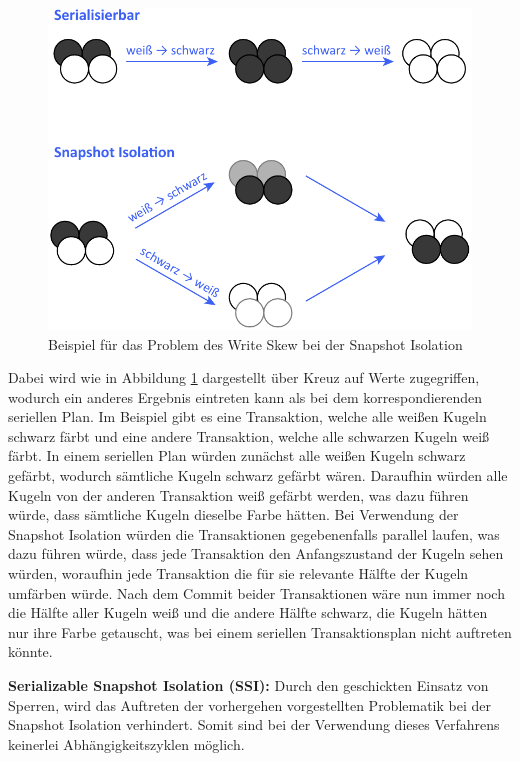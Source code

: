 \begin{figure}
	\includegraphics[width=0.8\columnwidth]{img/write_skew.pdf}
	\caption{Beispiel für das Problem des Write Skew bei der Snapshot Isolation \cite{write_skew}}
	\label{fig:write_skew}
\end{figure}

Dabei wird wie in Abbildung \ref{fig:write_skew} dargestellt über Kreuz auf Werte zugegriffen, wodurch ein anderes Ergebnis eintreten kann als bei dem korrespondierenden seriellen Plan.
Im Beispiel gibt es eine Transaktion, welche alle weißen Kugeln schwarz färbt und eine andere Transaktion, welche alle schwarzen Kugeln weiß färbt.
In einem seriellen Plan würden zunächst alle weißen Kugeln schwarz gefärbt, wodurch sämtliche Kugeln schwarz gefärbt wären.
Daraufhin würden alle Kugeln von der anderen Transaktion weiß gefärbt werden, was dazu führen würde, dass sämtliche Kugeln dieselbe Farbe hätten.
Bei Verwendung der Snapshot Isolation würden die Transaktionen gegebenenfalls parallel laufen, was dazu führen würde, dass jede Transaktion den Anfangszustand der Kugeln sehen würden, woraufhin jede Transaktion die für sie relevante Hälfte der Kugeln umfärben würde.
Nach dem Commit beider Transaktionen wäre nun immer noch die Hälfte aller Kugeln weiß und die andere Hälfte schwarz, die Kugeln hätten nur ihre Farbe getauscht, was bei einem seriellen Transaktionsplan nicht auftreten könnte.

\textbf{Serializable Snapshot Isolation (SSI):} Durch den geschickten Einsatz von Sperren, wird das Auftreten der vorhergehen vorgestellten Problematik bei der Snapshot Isolation verhindert.
Somit sind bei der Verwendung dieses Verfahrens keinerlei Abhängigkeitszyklen möglich.

